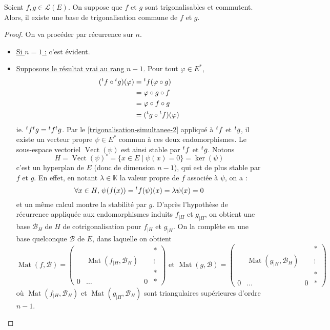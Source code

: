   \begin{theorem}
    Soient $f, g \in \mathcal{L}(E)$. On suppose que $f$ et $g$ sont trigonalisables et commutent. Alors, il existe une base de trigonalisation commune de $f$ et $g$.
  \end{theorem}

  \begin{proof}
    On va procéder par récurrence sur $n$.
    \begin{itemize}
      \item \uline{Si $n = 1$ :} c'est évident.
      \item \uline{Supposons le résultat vrai au rang $n - 1$.} Pour tout $\varphi \in E^*$,
      \begin{align*}
        (\mathstrut ^t f \circ \mathstrut ^t g)(\varphi) &= \mathstrut ^t f (\varphi \circ g) \\
        &= \varphi \circ g \circ f \\
        &= \varphi \circ f \circ g \\
        &= (\mathstrut ^t g \circ \mathstrut ^t f)(\varphi)
      \end{align*}
      ie. $\mathstrut ^t f \mathstrut ^t g = \mathstrut ^t f \mathstrut ^t g$. Par le \cref{trigonalisation-simultanee-2} appliqué à $\mathstrut ^t f$ et $\mathstrut ^t g$, il existe un vecteur propre $\psi \in E^*$ commun à ces deux endomorphismes. Le sous-espace vectoriel $\operatorname{Vect}(\psi)$ est ainsi stable par $\mathstrut ^t f$ et $\mathstrut ^t g$. Notons
      \[ H = \operatorname{Vect}(\psi)^{\circ} = \{ x \in E \mid \psi (x) = 0 \} = \ker(\psi) \]
      c'est un hyperplan de $E$ (donc de dimension $n-1$), qui est de plus stable par $f$ et $g$. En effet, en notant $\lambda \in \mathbb{K}$ la valeur propre de $f$ associée à $\psi$, on a :
      \[ \forall x \in H, \, \psi(f(x)) = \mathstrut ^t f(\psi)(x) = \lambda \psi(x) = 0 \]
      et un même calcul montre la stabilité par $g$. D'après l'hypothèse de récurrence appliquée aux endomorphismes induits $f_{|H}$ et $g_{|H}$, on obtient une base $\mathcal{B}_H$ de $H$ de cotrigonalisation pour $f_{|H}$ et $g_{|H}$. On la complète en une base quelconque $\mathcal{B}$ de $E$, dans laquelle on obtient
      \[
        \operatorname{Mat}(f, \mathcal{B}) =
        \begin{pmatrix}
          & & & * \\
          & \operatorname{Mat}(f_{|H}, \mathcal{B}_H) & & \vdots \\
          & & & * \\
          0 & \dots & 0 & *
        \end{pmatrix}
        \text{ et }
        \operatorname{Mat}(g, \mathcal{B}) =
        \begin{pmatrix}
          & & & * \\
          & \operatorname{Mat}(g_{|H}, \mathcal{B}_H) & & \vdots \\
          & & & * \\
          0 & \dots & 0 & *
        \end{pmatrix}
      \]
      où $\operatorname{Mat}(f_{|H}, \mathcal{B}_H)$ et $\operatorname{Mat}(g_{|H}, \mathcal{B}_H)$ sont triangulaires supérieures d'ordre $n-1$.
    \end{itemize}
  \end{proof}

